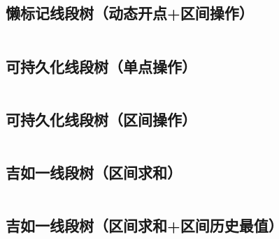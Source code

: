 \documentclass[a4paper]{article}
\begin{document}
\begin{multicols}{2}
\begin{spacing}{0.6}
\subsection{懒标记线段树（动态开点+区间操作）}
\inputminted{cpp}{\detokenize{Template/数据结构/06C - 懒标记线段树（动态开点+区间操作）.txt}}
\columnbreak

\subsection{可持久化线段树（单点操作）}
\inputminted{cpp}{\detokenize{Template/数据结构/07A - 可持久化线段树（单点操作）.txt}}
\columnbreak

\subsection{可持久化线段树（区间操作）}
\inputminted{cpp}{\detokenize{Template/数据结构/07A - 可持久化线段树（区间操作）.txt}}
\columnbreak

\subsection{吉如一线段树（区间求和）}
\inputminted{cpp}{\detokenize{Template/数据结构/08A - 吉如一线段树（区间求和）.txt}}
\columnbreak

\subsection{吉如一线段树（区间求和+区间历史最值）}
\inputminted{cpp}{\detokenize{Template/数据结构/08B - 吉如一线段树（区间求和+区间历史最值）.txt}}

\end{spacing}
\end{multicols}
\end{document}
